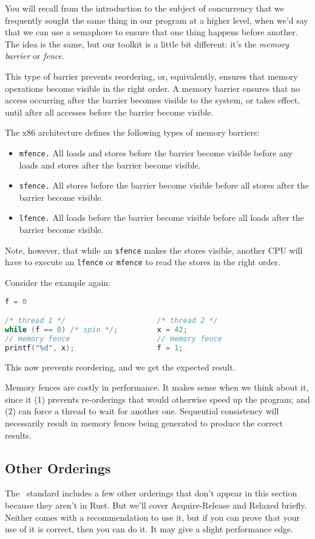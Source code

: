 You will recall from the introduction to the subject of concurrency that we frequently sought the same thing in our program at a higher level, when we'd say that we can use a semaphore to ensure that one thing happens before another. The idea is the same, but our toolkit is a little bit different: it's the \emph{memory barrier} or
\emph{fence}. 

This type of barrier prevents reordering, or,
equivalently, ensures that memory operations become visible in the
right order. A memory barrier ensures that no access occurring after
the barrier becomes visible to the system, or takes effect, until
after all accesses before the barrier become visible.


The x86 architecture defines the following types of memory 
barriers:

\begin{itemize}
\item {\tt mfence.} All loads and stores before the barrier become
visible before any loads and stores after the barrier become visible.
\item {\tt sfence.} All stores before the barrier become visible before
all stores after the barrier become visible.
\item {\tt lfence.} All loads before the barrier become visible before
all loads after the barrier become visible.
\end{itemize}

Note, however, that while an {\tt sfence} makes the stores visible,
another CPU will have to execute an {\tt lfence} or {\tt mfence} to
read the stores in the right order.

Consider the example again:
  \begin{lstlisting}[language=C]
                         f = 0

/* thread 1 */                     /* thread 2 */
while (f == 0) /* spin */;         x = 42;
// memory fence                    // memory fence
printf("%d", x);                   f = 1;
  \end{lstlisting}
This now prevents reordering, and we get the expected result.

Memory fences are costly in performance. It makes sense when we think about it, since it (1) prevents re-orderings that would otherwise speed up the program; and (2) can force a thread to wait for another one. Sequential consistency will necessarily result in memory fences being generated to produce the correct results. 

\subsection*{Other Orderings}
The \CPP~standard includes a few other orderings that don't appear in this section because they aren't in Rust. But we'll cover Acquire-Release and Relaxed briefly. Neither comes with a recommendation to use it, but if you can prove that your use of it is correct, then you can do it. It may give a slight performance edge.

